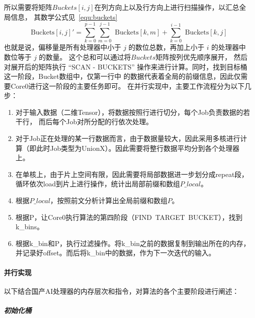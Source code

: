 所以需要将矩阵\(Buckets[i, j]\)在列方向上以及行方向上进行扫描操作，以汇总全局信息，
其数学公式见~\ref{equ:buckets}
\begin{equation}
    \text{ Buckets}[i, j]' = \sum_{k = 0}^{p - 1} \sum_{m = 0}^{j - 1} \text{ Buckets}[k, m] + \sum_{k = 0}^{i - 1} \text{ Buckets}[k, j]
    \label{equ:buckets}
\end{equation}
也就是说，偏移量是所有处理器中小于 $j$ 的数位总数，再加上小于 $i$ 的处理器中数位等于 $j$ 的数量。
这个总和可以通过将$Buckets$矩阵按列优先顺序展开，
然后对展开后的矩阵执行 “SCAN - BUCKETS” 操作来进行计算。同时，找到目标桶这一阶段，Bucket数组中，仅第一行中
的数据代表着全局的前缀信息，因此仅需要Core0进行这一阶段的主要任务即可。
在并行实现中，主要工作流程分为以下几步：
\begin{enumerate}
    \item 对于输入数据（二维Tensor），将数据按照行进行切分，每个Job负责数据的若干行，
    而后每个Job对所分配的行依次处理。
    \item 对于Job正在处理的某一行数据而言，由于数据量较大，因此采用多核进行计算（即此时Job类型为UnionX）。因此需要将整行数据平均分到各个处理器上。
    \item 在单核上，由于片上空间有限，因此需要将局部数据进一步划分成repeat段，循环依次load到片上进行操作，统计出局部前缀和数组\(P\_local\)。
    \item 根据\(P\_local\)，按照前文分析计算出全局前缀和数组\(P\)。
    \item 根据P，让Core0执行算法的第四阶段（FIND\ TARGET\ BUCKET），找到k\_bins。
    \item 根据k\_bin和P，执行过滤操作。将k\_bin之前的数据复制到输出所在的内存，并记录好offset。而后将k\_bin中的数据，作为下一次迭代的输入。
\end{enumerate}

\paragraph{并行实现}
以下结合国产AI处理器的内存层次和指令，对算法的各个主要阶段进行阐述：
\subparagraph{初始化桶}

